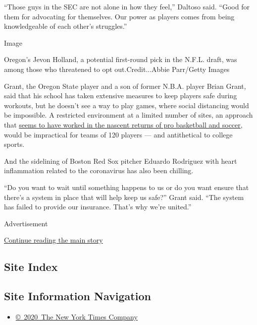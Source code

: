 ``Those guys in the SEC are not alone in how they feel,'' Daltoso said.
``Good for them for advocating for themselves. Our power as players
comes from being knowledgeable of each other's struggles.''

Image

Oregon's Jevon Holland, a potential first-round pick in the N.F.L.
draft, was among those who threatened to opt out.Credit...Abbie
Parr/Getty Images

Grant, the Oregon State player and a son of former N.B.A. player Brian
Grant, said that his school has taken extensive measures to keep players
safe during workouts, but he doesn't see a way to play games, where
social distancing would be impossible. A restricted environment at a
limited number of sites, an approach that
\href{https://www.nytimes3xbfgragh.onion/2020/07/30/sports/basketball/sports-bubble-nba-mlb.html}{seems
to have worked in the nascent returns of pro basketball and soccer},
would be impractical for teams of 120 players --- and antithetical to
college sports.

And the sidelining of Boston Red Sox pitcher Eduardo Rodriguez with
heart inflammation related to the coronavirus has also been chilling.

``Do you want to wait until something happens to us or do you want
ensure that there's a system in place that will help keep us safe?''
Grant said. ``The system has failed to provide our insurance. That's why
we're united.''

Advertisement

\protect\hyperlink{after-bottom}{Continue reading the main story}

\hypertarget{site-index}{%
\subsection{Site Index}\label{site-index}}

\hypertarget{site-information-navigation}{%
\subsection{Site Information
Navigation}\label{site-information-navigation}}

\begin{itemize}
\tightlist
\item
  \href{https://help.nytimes3xbfgragh.onion/hc/en-us/articles/115014792127-Copyright-notice}{©~2020~The
  New York Times Company}
\end{itemize}

